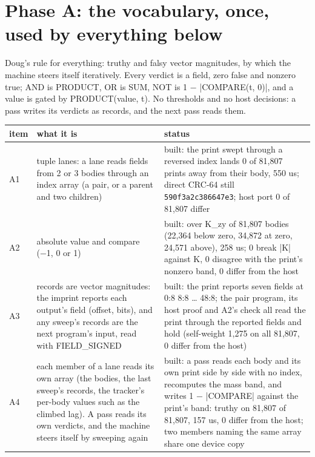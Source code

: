 \section{\texorpdfstring{Phase A: the vocabulary, once, used by everything below}{Phase A: the vocabulary, once, used by everything below}}

Doug's rule for everything: truthy and falsy vector magnitudes, by which the machine steers itself iteratively. Every verdict is a field, zero false and nonzero true; AND is PRODUCT, OR is SUM, NOT is 1 − |COMPARE(t, 0)|, and a value is gated by PRODUCT(value, t). No thresholds and no host decisions: a pass writes its verdicts as records, and the next pass reads them.

{\small
\setlength{\tabcolsep}{6pt}
\begin{longtable}{>{\RaggedRight\arraybackslash}p{}>{\RaggedRight\arraybackslash}p{}>{\RaggedRight\arraybackslash}p{}}
\toprule
item & what it is & status \\
\midrule
\endhead
A1 & tuple lanes: a lane reads fields from 2 or 3 bodies through an index array (a pair, or a parent and two children) & built: the print swept through a reversed index lands 0 of 81,807 prints away from their body, 550 us; direct CRC-64 still \texttt{590f3a2c386647e3}; host port 0 of 81,807 differ \\
A2 & absolute value and compare (−1, 0 or 1) & built: over K\_\allowbreak{}zy of 81,807 bodies (22,364 below zero, 34,872 at zero, 24,571 above), 258 us; 0 break |K| against K, 0 disagree with the print's nonzero band, 0 differ from the host \\
A3 & records are vector magnitudes: the imprint reports each output's field (offset, bits), and any sweep's records are the next program's input, read with FIELD\_\allowbreak{}SIGNED & built: the print reports seven fields at 0:8 8:8 … 48:8; the pair program, its host proof and A2's check all read the print through the reported fields and hold (self-weight 1,275 on all 81,807, 0 differ from the host) \\
A4 & each member of a lane reads its own array (the bodies, the last sweep's records, the tracker's per-body values such as the climbed lag). A pass reads its own verdicts, and the machine steers itself by sweeping again & built: a pass reads each body and its own print side by side with no index, recomputes the mass band, and writes 1 − |COMPARE| against the print's band: truthy on 81,807 of 81,807, 157 us, 0 differ from the host; two members naming the same array share one device copy \\
\bottomrule
\end{longtable}
}


